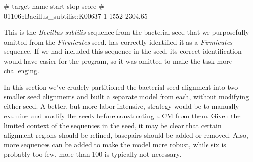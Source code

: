 \begin{sreoutput}
# target name                        start    stop     score
# --------------------------------  ------  ------  --------
  01106::Bacillus_subtilis::K00637       1    1552   2304.65
\end{sreoutput}

This is the \emph{Bacillus subtilis} sequence from the bacterial seed
that we purposefully omitted from the \emph{Firmicutes}
seed.  has correctly identified it as a
\emph{Firmicutes} sequence. If we had included this sequence in the
seed, its correct identification would have easier for the program, so
it was omitted to make the task more challenging.

In this section we've crudely partitioned the bacterial seed alignment
into two smaller seed alignments and built a separate model from each,
without modifying either seed. A better, but more labor intensive,
strategy would be to manually examine and modify the seeds before constructing a
CM from them. Given the limited context of the sequences in the seed,
it may be clear that certain alignment regions should be refined,
basepairs should be added or removed. Also, more sequences
can be added to make the model more robust, while six is probably too
few, more than 100 is typically not necessary.

